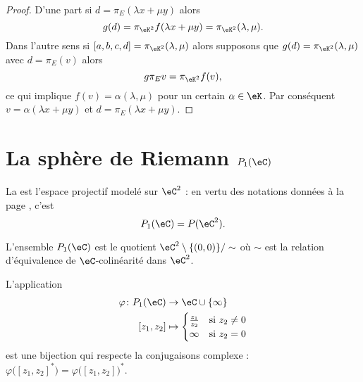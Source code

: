 \begin{proof}
    D'une part si \( d=\pi_E(\lambda x+\mu y)\) alors
    \begin{equation}
        g(d)=\pi_{\eK^2}f(\lambda x+\mu y)=\pi_{\eK^2}(\lambda,\mu).
    \end{equation}
    Dans l'autre sens si \( [a,b,c,d]=\pi_{\eK^2}(\lambda,\mu)\) alors supposons que \( g(d)=\pi_{\eK^2}(\lambda,\mu)\) avec \( d=\pi_E(v)\) alors
    \begin{equation}
        g\pi_Ev=\pi_{\eK^2}f(v),
    \end{equation}
    ce qui implique \( f(v)=\alpha(\lambda,\mu)\) pour un certain \( \alpha\in \eK\). Par conséquent \( v=\alpha(\lambda x+\mu y)\) et \( d=\pi_E(\lambda x+\mu y)\).
\end{proof}

\section{La sphère de Riemann \( P_1(\eC)\)}

\begin{definition}      \label{DEFooSZGNooTzFYbh}
    La  est l'espace projectif modelé sur \( \eC^2\) : en vertu des notations données à la page \pageref{PgNotimesjNtMoW}, c'est
    \begin{equation}
        P_1(\eC)=P(\eC^2).
    \end{equation}
\end{definition}

L'ensemble \( P_1(\eC)\) est le quotient \( \eC^2\setminus\{ (0,0) \}/\sim\) où \( \sim\) est la relation d'équivalence de \( \eC\)-colinéarité dans \( \eC^2\).

\begin{lemma}
    L'application
    \begin{equation}        \label{EQooKJIZooZjhzuU}
        \begin{aligned}
            \varphi\colon P_1(\eC)&\to \eC\cup\{ \infty \} \\
            [z_1,z_2]&\mapsto \begin{cases}
                \frac{ z_1 }{ z_2 }    &   \text{si } z_2\neq 0\\
                \infty    &    \text{si } z_2=0
            \end{cases}
        \end{aligned}
    \end{equation}
    est une bijection qui respecte la conjugaisons complexe : \( \varphi\big( [z_1,z_2]^* \big)=\varphi\big( [z_1,z_2] \big)^*\).
\end{lemma}

